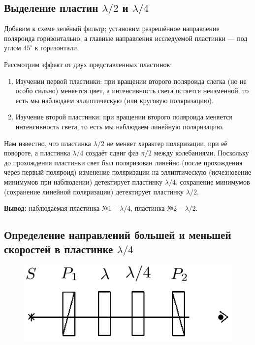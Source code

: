 	\subsection*{Выделение пластин $\lambda/2$ и $\lambda/4$}
	Добавим к схеме зелёный фильтр; установим разрешённое направление поляроида горизонтально, а главные направления исследуемой пластинки — под углом $45^{\circ}$ к горизонтали.
	
	Рассмотрим эффект от двух представленных пластинок:
	
	\begin{enumerate}
		\item Изучении первой пластинки: при вращении второго поляроида слегка (но не особо сильно) меняется цвет, а интенсивность света остается неизменной, то есть мы наблюдаем эллиптическую (или круговую поляризацию).
		\item Изучение второй пластинки: при вращении второго поляроида меняется интенсивность света, то есть мы наблюдаем линейную поляризацию.
	\end{enumerate} 

	Нам известно, что пластинка $\lambda/2$ не меняет характер поляризации, при её повороте, а пластинка $\lambda/4$ создаёт сдвиг фаз $\pi/2$ между колебаниями. Поскольку до прохождения пластинки свет был поляризован линейно (после прохождения через первый поляроид) изменение поляризации на эллиптическую (исчезновение минимумов при наблюдении) детектирует пластинку $\lambda/4$, сохранение минимумов (сохранение линейной поляризации) детектирует пластинку $\lambda/2$.
	
	\noindent \textbf{Вывод:} наблюдаемая пластинка №1 -- $\lambda/4$, пластинка №2 -- $\lambda/2$.
	
	\subsection*{Определение направлений большей и меньшей скоростей в пластинке $\lambda/4$}
	
	\begin{figure}
		\centering
		\includegraphics[width=0.5\textheight]{./images/VI.png}
		\caption{}
	\end{figure}
	
